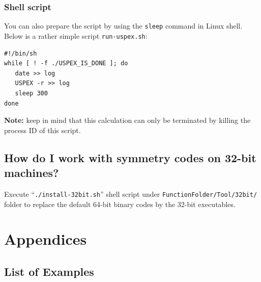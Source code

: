 \documentclass[12pt]{article}
\newcommand{\keyword}[1]{\texttt{#1}}
\newcommand{\file}[1]{\texttt{#1}}
\begin{document}
\subsubsection{Shell script}
You can also prepare the script by using the \keyword{sleep} command in Linux
shell. Below is a rather simple script \file{run-uspex.sh}:

\begin{lstlisting}
#!/bin/sh
while [ ! -f ./USPEX_IS_DONE ]; do
   date >> log 
   USPEX -r >> log
   sleep 300
done
\end{lstlisting}

\textbf{Note:} keep in mind that this calculation can only be terminated by
killing the process ID of this script.


\subsection{How do I work with symmetry codes on 32-bit machines?}
\label{faq_32bit}
Execute ``\file{./install-32bit.sh}'' shell script under
\file{FunctionFolder/Tool/32bit/} folder to replace the default 64-bit binary
codes by the 32-bit executables.


\newpage
\section{Appendices}

\subsection{List of Examples} \label{appendix_examples}
\end{document}
